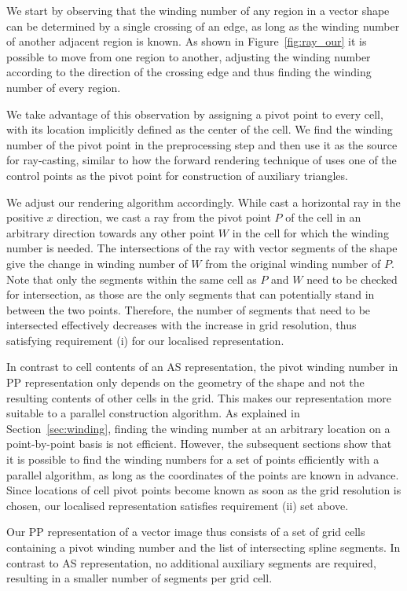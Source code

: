 \documentclass[11pt,a4paper,twoside]{article}
\begin{document}
We start by observing that the winding number of any region in a vector shape can be determined by a single crossing of an edge, as long as the winding number of another adjacent region is known. As shown in Figure~\ref{fig:ray_our} it is possible to move from one region to another, adjusting the winding number according to the direction of the crossing edge and thus finding the winding number of every region.

We take advantage of this observation by assigning a pivot point to every cell, with its location implicitly defined as the center of the cell. We find the winding number of the pivot point in the preprocessing step and then use it as the source for ray-casting, similar to how the forward rendering technique of \cite{Kokojima06} uses one of the control points as the pivot point for construction of auxiliary triangles.

We adjust our rendering algorithm accordingly. While \cite{NehabHoppe08} cast a horizontal ray in the positive $x$ direction, we cast a ray from the pivot point $P$ of the cell in an arbitrary direction towards any other point $W$ in the cell for which the winding number is needed. The intersections of the ray with vector segments of the shape give the change in winding number of $W$ from the original winding number of $P$. Note that only the segments within the same cell as $P$ and $W$ need to be checked for intersection, as those are the only segments that can potentially stand in between the two points. Therefore, the number of segments that need to be intersected effectively decreases with the increase in grid resolution, thus satisfying requirement (i) for our localised representation.

In contrast to cell contents of an AS representation, the pivot winding number in PP representation only depends on the geometry of the shape and not the resulting contents of other cells in the grid. This makes our representation more suitable to a parallel construction algorithm. As explained in Section~\ref{sec:winding}, finding the winding number at an arbitrary location on a point-by-point basis is not efficient. However, the subsequent sections show that it is possible to find the winding numbers for a set of points efficiently with a parallel algorithm, as long as the coordinates of the points are known in advance. Since locations of cell pivot points become known as soon as the grid resolution is chosen, our localised representation satisfies requirement (ii) set above.

Our PP representation of a vector image thus consists of a set of grid cells containing a pivot winding number and the list of intersecting spline segments. In contrast to AS representation, no additional auxiliary segments are required, resulting in a smaller number of segments per grid cell.
\end{document}
